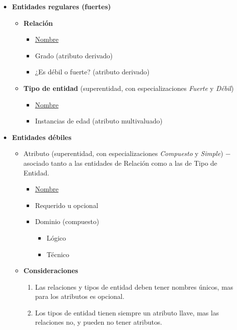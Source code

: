 \begin{itemize}
    \item \textbf{Entidades regulares (fuertes)}
    \begin{itemize}
        \item \textbf{Relación}
        \begin{itemize}
            \item \underline{Nombre}
            \item Grado (atributo derivado)
            \item ¿Es débil o fuerte? (atributo derivado)
        \end{itemize}
        \item \textbf{Tipo de entidad} (superentidad, con especializaciones \textit{Fuerte} y \textit{Débil})
        \begin{itemize}
            \item \underline{Nombre}
            \item Instancias de edad (atributo multivaluado)
        \end{itemize}
    \end{itemize}
    \item \textbf{Entidades débiles}
    \begin{itemize}
        \item Atributo (superentidad, con especializaciones \textit{Compuesto} y \textit{Simple}) $-$asociado tanto a las entidades de Relación como a las de Tipo de Entidad.
        \begin{itemize}
            \item \underline{Nombre}
            \item Requerido u opcional
            \item Dominio (compuesto)
            \begin{itemize}
                \item Lógico
                \item Técnico
            \end{itemize}
        \end{itemize}
    \end{itemize}
    \begin{itemize}
        \item \textbf{Consideraciones}
        \begin{enumerate}
            \item Las relaciones y tipos de entidad deben tener nombres únicos, mas para los atributos es opcional.
            \item Los tipos de entidad tienen siempre un atributo llave, mas las relaciones no, y pueden no tener atributos.

\end{enumerate}
\end{itemize}
\end{itemize}
